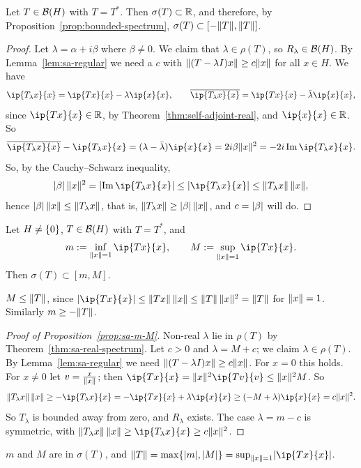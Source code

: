 \begin{theorem}\label{thm:sa-real-spectrum}
Let $T \in \mathcal{B}(H)$ with $T = T^*$. Then $\sigma(T) \subset \mathbb{R}$, and
therefore, by Proposition~\ref{prop:bounded-spectrum},
$\sigma(T) \subset [-\lVert T\rVert, \lVert T\rVert]$.
\end{theorem}

\begin{proof}
Let $\lambda = \alpha + i\beta$ where $\beta \ne 0$. We claim that
$\lambda \in \rho(T)$, so $R_\lambda \in \mathcal{B}(H)$. By
Lemma~\ref{lem:sa-regular} we need a $c$ with
$\lVert(T - \lambda I)x\rVert \ge c\lVert x\rVert$ for all $x \in H$. We have
\[
  \ip{T_\lambda x}{x} = \ip{Tx}{x} - \lambda\ip{x}{x} ,
  \qquad
  \overline{\ip{T_\lambda x}{x}} = \ip{Tx}{x} - \bar{\lambda}\ip{x}{x} ,
\]
since $\ip{Tx}{x} \in \R$, by Theorem~\ref{thm:self-adjoint-real}, and
$\ip{x}{x} \in \R$. So
\[
  \overline{\ip{T_\lambda x}{x}} - \ip{T_\lambda x}{x}
  = (\lambda - \bar{\lambda})\ip{x}{x} = 2i\beta\norm{x}^2
  = -2i \operatorname{Im}\ip{T_\lambda x}{x} .
\]
So, by the Cauchy--Schwarz inequality,
\[
  \abs{\beta}\,\norm{x}^2 = \abs{\operatorname{Im}\ip{T_\lambda x}{x}}
  \le \abs{\ip{T_\lambda x}{x}} \le \norm{T_\lambda x}\,\norm{x} ,
\]
hence $\lvert\beta\rvert\,\lVert x\rVert \le \lVert T_\lambda x\rVert$, that is,
$\lVert T_\lambda x\rVert \ge \lvert\beta\rvert\,\lVert x\rVert$, and $c = \lvert\beta\rvert$ will
do.
\end{proof}

\begin{proposition}\label{prop:sa-m-M}
Let $H \ne \{0\}$, $T \in \mathcal{B}(H)$ with $T = T^*$, and
\[
  m := \inf_{\norm{x} = 1} \ip{Tx}{x} , \qquad
  M := \sup_{\norm{x} = 1} \ip{Tx}{x} .
\]
Then $\sigma(T) \subset [m, M]$.
\end{proposition}

\begin{remark}
$M \le \lVert T\rVert$, since
$\abs{\ip{Tx}{x}} \le \norm{Tx}\,\norm{x} \le \norm{T}\,\norm{x}^2 =
\norm{T}$ for $\lVert x\rVert = 1$. Similarly $m \ge -\lVert T\rVert$.
\end{remark}

\begin{proof}[Proof of Proposition~\ref{prop:sa-m-M}]
Non-real $\lambda$ lie in $\rho(T)$ by Theorem~\ref{thm:sa-real-spectrum}.
Let $c > 0$ and $\lambda = M + c$; we claim $\lambda \in \rho(T)$. By
Lemma~\ref{lem:sa-regular} we need $\lVert(T - \lambda I)x\rVert \ge c\lVert x\rVert$.
For $x = 0$ this holds. For $x \ne 0$ let $v = \frac{x}{\lVert x\rVert}$; then
$\ip{Tx}{x} = \norm{x}^2 \ip{Tv}{v} \le \norm{x}^2 M$. So
\[
  \norm{T_\lambda x}\,\norm{x} \ge -\ip{T_\lambda x}{x}
  = -\ip{Tx}{x} + \lambda\ip{x}{x}
  \ge (-M + \lambda)\ip{x}{x} = c\norm{x}^2 .
\]
So $T_\lambda$ is bounded away from zero, and $R_\lambda$ exists. The case
$\lambda = m - c$ is symmetric, with
$\norm{T_\lambda x}\,\norm{x} \ge \ip{T_\lambda x}{x} \ge c\norm{x}^2$.
\end{proof}

\begin{proposition}\label{prop:sa-m-M-in-spectrum}
$m$ and $M$ are in $\sigma(T)$, and
$\norm{T} = \max\set{\abs{m}, \abs{M}} = \sup_{\norm{x} = 1}
\abs{\ip{Tx}{x}}$.
\end{proposition}
